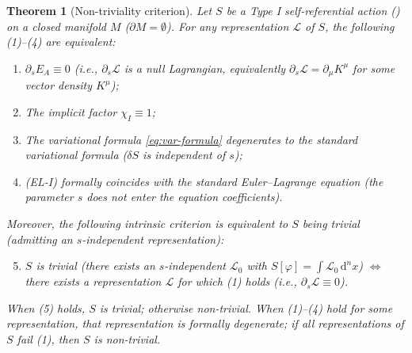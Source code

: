 \documentclass[12pt,letterpaper]{article}
\newtheorem{theorem}{Theorem}[section]
\theoremstyle{definition}
\newcommand{\mL}{\mathcal{L}}
\newcommand{\diff}{\mathrm{d}}
\newcommand{\chiI}{\chi_I}
\newcommand{\dVol}{\,\diff^n x}
\begin{document}
\begin{theorem}[Non-triviality criterion]
\label{thm:p12}
Let $S$ be a Type I self-referential action () on a closed manifold $M$ ($\partial M = \emptyset$). For \emph{any} representation $\mL$ of $S$, the following (1)--(4) are equivalent:
\begin{enumerate}[leftmargin=*]
\item $\partial_s E_A \equiv 0$ (i.e., $\partial_s \mL$ is a null Lagrangian, equivalently $\partial_s \mL = \partial_\mu K^\mu$ for some vector density $K^\mu$);
\item The implicit factor $\chiI \equiv 1$;
\item The variational formula \eqref{eq:var-formula} degenerates to the standard variational formula ($\delta S$ is independent of $s$);
\item (EL-I) formally coincides with the standard Euler--Lagrange equation (the parameter $s$ does not enter the equation coefficients).
\end{enumerate}
Moreover, the following intrinsic criterion is equivalent to $S$ being trivial (admitting an $s$-independent representation):
\begin{enumerate}[leftmargin=*]\setcounter{enumi}{4}
\item $S$ is trivial (there exists an $s$-independent $\mL_0$ with $S[\varphi] = \int \mL_0 \dVol$) $\iff$ there exists a representation $\mL$ for which (1) holds (i.e., $\partial_s \mL \equiv 0$).
\end{enumerate}
When (5) holds, $S$ is \emph{trivial}; otherwise \emph{non-trivial}. When (1)--(4) hold for some representation, that representation is \emph{formally degenerate}; if \emph{all} representations of $S$ fail (1), then $S$ is non-trivial.
\end{theorem}
\end{document}
